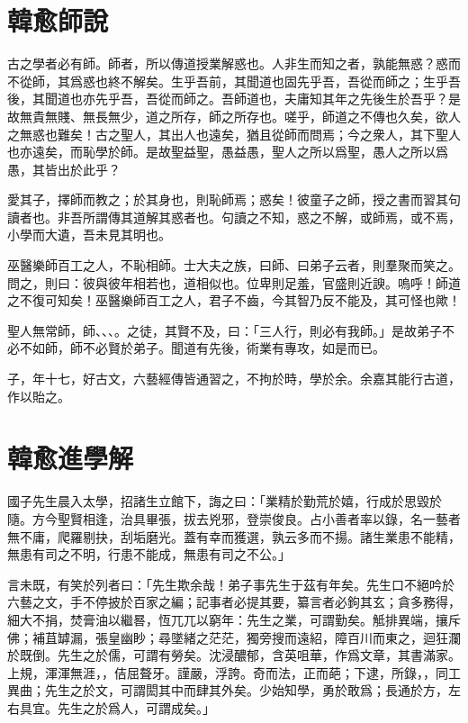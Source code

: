 
\section[師說\quad{\small 韓愈}]{{\normalsize 韓愈}\quad 師說}
古之學者必有師。師者，所以傳道授業解惑也。人非生而知之者，孰能無惑？惑而不從師，其爲惑也終不解矣。生乎吾前，其聞道也固先乎吾，吾從而師之；生乎吾後，其聞道也亦先乎吾，吾從而師之。吾師道也，夫庸知其年之先後生於吾乎？是故無貴無賤、無長無少，道之所存，師之所存也。嗟乎，師道之不傳也久矣，欲人之無惑也難矣！古之聖人，其出人也遠矣，猶且從師而問焉；今之衆人，其下聖人也亦遠矣，而恥學於師。是故聖益聖，愚益愚，聖人之所以爲聖，愚人之所以爲愚，其皆出於此乎？

愛其子，擇師而教之；於其身也，則恥師焉；惑矣！彼童子之師，授之書而習其句讀者也。非吾所謂傳其道解其惑者也。句讀之不知，惑之不解，或師焉，或不焉，小學而大遺，吾未見其明也。

巫醫樂師百工之人，不恥相師。士大夫之族，曰師、曰弟子云者，則羣聚而笑之。問之，則曰：彼與彼年相若也，道相似也。位卑則足羞，官盛則近諛。嗚呼！師道之不復可知矣！巫醫樂師百工之人，君子不齒，今其智乃反不能及，其可怪也歟！

聖人無常師，師、、、。之徒，其賢不及，曰：「三人行，則必有我師。」是故弟子不必不如師，師不必賢於弟子。聞道有先後，術業有專攻，如是而已。

子，年十七，好古文，六藝經傳皆通習之，不拘於時，學於余。余嘉其能行古道，作以貽之。

\section[進學解\quad{\small 韓愈}]{{\normalsize 韓愈}\quad 進學解}
國子先生晨入太學，招諸生立館下，誨之曰：「業精於勤荒於嬉，行成於思毀於隨。方今聖賢相逢，治具畢張，拔去兇邪，登崇俊良。占小善者率以錄，名一藝者無不庸，爬羅剔抉，刮垢磨光。蓋有幸而獲選，孰云多而不揚。諸生業患不能精，無患有司之不明，行患不能成，無患有司之不公。」

言未既，有笑於列者曰：「先生欺余哉！弟子事先生于茲有年矣。先生口不絕吟於六藝之文，手不停披於百家之編；記事者必提其要，纂言者必鉤其玄；貪多務得，細大不捐，焚膏油以繼晷，恆兀兀以窮年：先生之業，可謂勤矣。觝排異端，攘斥佛；補苴罅漏，張皇幽眇；尋墜緒之茫茫，獨旁搜而遠紹，障百川而東之，迴狂瀾於既倒。先生之於儒，可謂有勞矣。沈浸醲郁，含英咀華，作爲文章，其書滿家。上規，渾渾無涯，，佶屈聱牙。謹嚴，浮誇。奇而法，正而葩；下逮，所錄，，同工異曲；先生之於文，可謂閎其中而肆其外矣。少始知學，勇於敢爲；長通於方，左右具宜。先生之於爲人，可謂成矣。」

